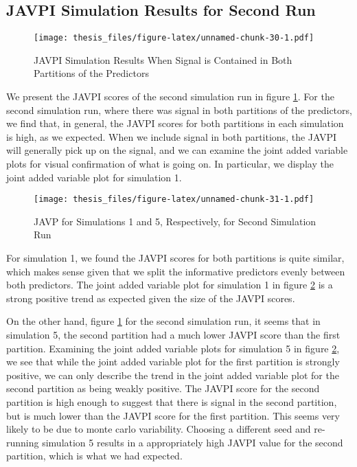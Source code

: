 \documentclass[12pt,twoside]{reedthesis}
\theoremstyle{definition}
\theoremstyle{definition}
\theoremstyle{definition}
\theoremstyle{remark}
\begin{document}
\subsection{JAVPI Simulation Results for Second
Run}\label{javpi-simulation-results-for-second-run}
\begin{figure}
\centering
\texttt{[image: thesis\_files/figure-latex/unnamed-chunk-30-1.pdf]}
\caption{\label{fig:unnamed-chunk-30}\label{JAVPItwosig}JAVPI Simulation
Results When Signal is Contained in Both Partitions of the Predictors}
\end{figure}
We present the JAVPI scores of the second simulation run in figure
\ref{JAVPItwosig}. For the second simulation run, where there was signal
in both partitions of the predictors, we find that, in general, the
JAVPI scores for both partitions in each simulation is high, as we
expected. When we include signal in both partitions, the JAVPI will
generally pick up on the signal, and we can examine the joint added
variable plots for visual confirmation of what is going on. In
particular, we display the joint added variable plot for simulation 1.
\par 
\begin{figure}
\centering
\texttt{[image: thesis\_files/figure-latex/unnamed-chunk-31-1.pdf]}
\caption{\label{fig:unnamed-chunk-31}\label{siml1and5plots}JAVP for
Simulations 1 and 5, Respectively, for Second Simulation Run}
\end{figure}
For simulation 1, we found the JAVPI scores for both partitions is quite
similar, which makes sense given that we split the informative
predictors evenly between both predictors. The joint added variable plot
for simulation 1 in figure \ref{siml1and5plots} is a strong positive
trend as expected given the size of the JAVPI scores. \par 

On the other hand, figure \ref{JAVPItwosig} for the second simulation
run, it seems that in simulation 5, the second partition had a much
lower JAVPI score than the first partition. Examining the joint added
variable plots for simulation 5 in figure \ref{siml1and5plots}, we see
that while the joint added variable plot for the first partition is
strongly positive, we can only describe the trend in the joint added
variable plot for the second partition as being weakly positive. The
JAVPI score for the second partition is high enough to suggest that
there is signal in the second partition, but is much lower than the
JAVPI score for the first partition. This seems very likely to be due to
monte carlo variability. Choosing a different seed and re-running
simulation 5 results in a appropriately high JAVPI value for the second
partition, which is what we had expected. \par 
\end{document}
